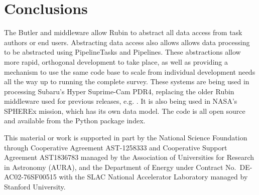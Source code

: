 \documentclass[11pt,twoside]{article}
\begin{document}
\section{Conclusions}
The Butler and middleware allow Rubin to abstract all data access from task authors or end users. Abstracting data access also allows allows data processing to be abstracted using PipelineTasks and Pipelines. These abstractions allow more rapid, orthogonal development to take place, as well as providing a mechanism to use the same code base to scale from individual development needs all the way up to running the complete survey. These systems are being used in processing Subaru's Hyper Suprime-Cam PDR4, replacing the older Rubin middleware used for previous releases, e.g. \citet{2018PASJ...70S...5B}. It is also being used in NASA's SPHEREx mission, which has its own data model. The code is all open source and available from the Python package index.

\acknowledgments This material or work is supported in part by the National Science Foundation through Cooperative Agreement AST-1258333 and Cooperative Support Agreement AST1836783 managed by the Association of Universities for Research in Astronomy (AURA), and the Department of Energy under Contract No.\ DE-AC02-76SF00515 with the SLAC National Accelerator Laboratory managed by Stanford University.


\end{document}
